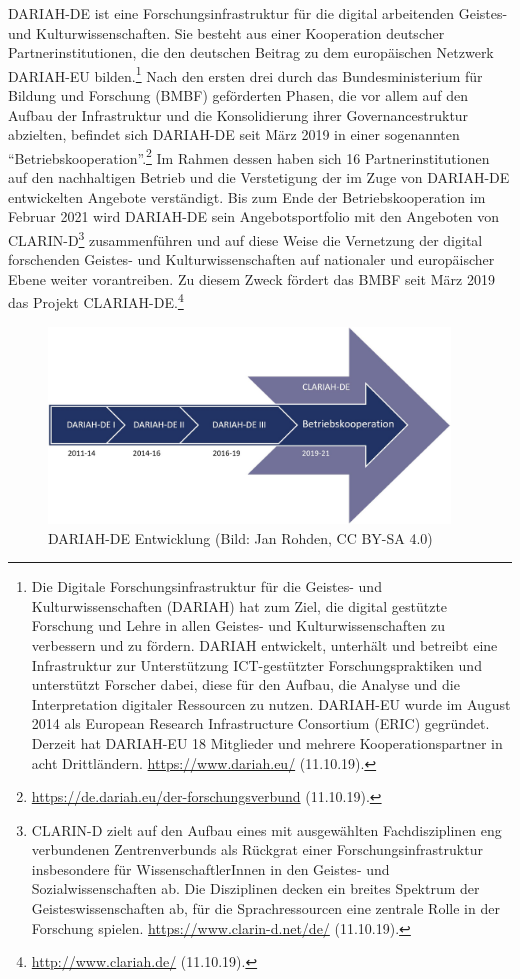 \documentclass[a4paper,
fontsize=11pt,
oneside,
numbers=noperiodatend,
parskip=half-,
bibliography=totoc,
final
]{scrartcl}
\begin{document}
DARIAH-DE ist eine Forschungsinfrastruktur für die digital arbeitenden
Geistes- und Kulturwissenschaften. Sie besteht aus einer Kooperation
deutscher Partnerinstitutionen, die den deutschen Beitrag zu dem
europäischen Netzwerk DARIAH-EU bilden.\footnote{Die Digitale
  Forschungsinfrastruktur für die Geistes- und Kulturwissenschaften
  (DARIAH) hat zum Ziel, die digital gestützte Forschung und Lehre in
  allen Geistes- und Kulturwissenschaften zu verbessern und zu fördern.
  DARIAH entwickelt, unterhält und betreibt eine Infrastruktur zur
  Unterstützung ICT-gestützter Forschungspraktiken und unterstützt
  Forscher dabei, diese für den Aufbau, die Analyse und die
  Interpretation digitaler Ressourcen zu nutzen. DARIAH-EU wurde im
  August 2014 als European Research Infrastructure Consortium (ERIC)
  gegründet. Derzeit hat DARIAH-EU 18 Mitglieder und mehrere
  Kooperationspartner in acht Drittländern. \url{https://www.dariah.eu/}
  (11.10.19).} Nach den ersten drei durch das Bundesministerium für
Bildung und Forschung (BMBF) geförderten Phasen, die vor allem auf den
Aufbau der Infrastruktur und die Konsolidierung ihrer Governancestruktur
abzielten, befindet sich DARIAH-DE seit März 2019 in einer sogenannten
\enquote{Betriebskooperation}.\footnote{\url{https://de.dariah.eu/der-forschungsverbund}
  (11.10.19).} Im Rahmen dessen haben sich 16 Partnerinstitutionen auf
den nachhaltigen Betrieb und die Verstetigung der im Zuge von DARIAH-DE
entwickelten Angebote verständigt. Bis zum Ende der Betriebskooperation
im Februar 2021 wird DARIAH-DE sein Angebotsportfolio mit den Angeboten
von CLARIN-D\footnote{CLARIN-D zielt auf den Aufbau eines mit
  ausgewählten Fachdisziplinen eng verbundenen Zentrenverbunds als
  Rückgrat einer Forschungsinfrastruktur insbesondere für
  WissenschaftlerInnen in den Geistes- und Sozialwissenschaften ab. Die
  Disziplinen decken ein breites Spektrum der Geisteswissenschaften ab,
  für die Sprachressourcen eine zentrale Rolle in der Forschung spielen.
  \url{https://www.clarin-d.net/de/} (11.10.19).} zusammenführen und auf
diese Weise die Vernetzung der digital forschenden Geistes- und
Kulturwissenschaften auf nationaler und europäischer Ebene weiter
vorantreiben. Zu diesem Zweck fördert das BMBF seit März 2019 das
Projekt CLARIAH-DE.\footnote{\url{http://www.clariah.de/} (11.10.19).}

\begin{figure}
\centering
\includegraphics[width=0.95\textwidth]{img/DARIAHEntwicklung.jpg}
\caption{DARIAH-DE Entwicklung (Bild: Jan Rohden, CC BY-SA 4.0)}
\end{figure}
\end{document}
